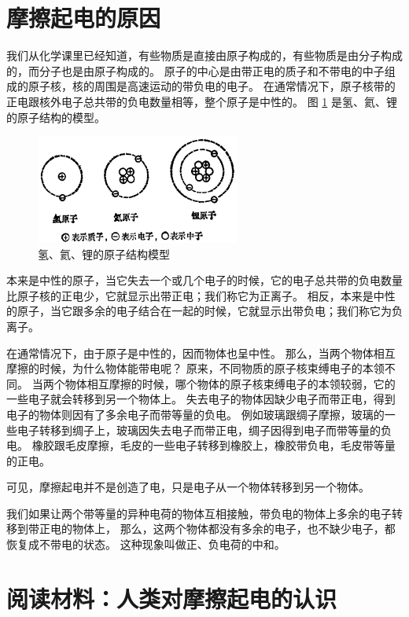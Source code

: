 \section{摩擦起电的原因}\label{sec:7-2}

我们从化学课里已经知道，有些物质是直接由原子构成的，有些物质是由分子构成的，而分子也是由原子构成的。
原子的中心是由带正电的质子和不带电的中子组成的原子核，核的周围是高速运动的带负电的电子。
在通常情况下，原子核带的正电跟核外电子总共带的负电数量相等，整个原子是中性的。
图 \ref{fig:7-6} 是氢、氦、锂的原子结构的模型。

\begin{figure}[htbp]
    \centering
    \includegraphics[width=0.6\textwidth]{../pic/czwl2-ch7-6}
    \caption{氢、氦、锂的原子结构模型}\label{fig:7-6}
\end{figure}

本来是中性的原子，当它失去一个或几个电子的时候，它的电子总共带的负电数量比原子核的正电少，它就显示出带正电；我们称它为正离子。
相反，本来是中性的原子，当它跟多余的电子结合在一起的时候，它就显示出带负电；我们称它为负离子。

在通常情况下，由于原子是中性的，因而物体也呈中性。
那么，当两个物体相互摩擦的时候，为什么物体能带电呢？
原来，不同物质的原子核束缚电子的本领不同。
当两个物体相互摩擦的时候，哪个物体的原子核束缚电子的本领较弱，它的一些电子就会转移到另一个物体上。
失去电子的物体因缺少电子而带正电，得到电子的物体则因有了多余电子而带等量的负电。
例如玻璃跟绸子摩擦，玻璃的一些电子转移到绸子上，玻璃因失去电子而带正电，绸子因得到电子而带等量的负电。
橡胶跟毛皮摩擦，毛皮的一些电子转移到橡胶上，橡胶带负电，毛皮带等量的正电。

可见，摩擦起电并不是创造了电，只是电子从一个物体转移到另一个物体。

我们如果让两个带等量的异种电荷的物体互相接触，带负电的物体上多余的电子转移到带正电的物体上，
那么，这两个物体都没有多余的电子，也不缺少电子，都恢复成不带电的状态。
这种现象叫做正、负电荷的中和。



\section*{阅读材料：人类对摩擦起电的认识}

